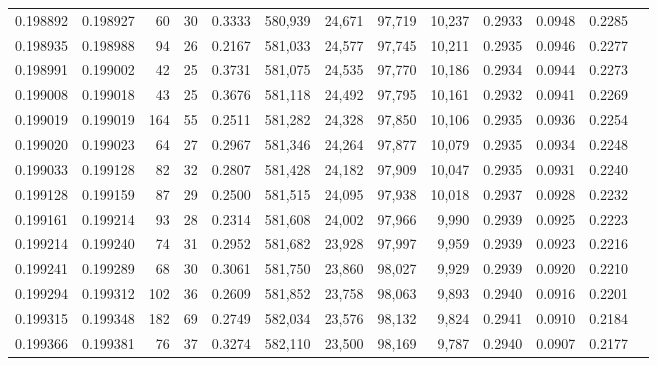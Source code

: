 \begin{tabular}{rrrrrrrrrrrrr}
0.198892 & 0.198927 &    60 &  30 &                                     0.3333 & 580,939 &  24,671 &  97,719 &  10,237 & 0.2933 & 0.0948 & 0.2285 \\
0.198935 & 0.198988 &    94 &  26 &                                     0.2167 & 581,033 &  24,577 &  97,745 &  10,211 & 0.2935 & 0.0946 & 0.2277 \\
0.198991 & 0.199002 &    42 &  25 &                                     0.3731 & 581,075 &  24,535 &  97,770 &  10,186 & 0.2934 & 0.0944 & 0.2273 \\
0.199008 & 0.199018 &    43 &  25 &                                     0.3676 & 581,118 &  24,492 &  97,795 &  10,161 & 0.2932 & 0.0941 & 0.2269 \\
0.199019 & 0.199019 &   164 &  55 &                                     0.2511 & 581,282 &  24,328 &  97,850 &  10,106 & 0.2935 & 0.0936 & 0.2254 \\
0.199020 & 0.199023 &    64 &  27 &                                     0.2967 & 581,346 &  24,264 &  97,877 &  10,079 & 0.2935 & 0.0934 & 0.2248 \\
0.199033 & 0.199128 &    82 &  32 &                                     0.2807 & 581,428 &  24,182 &  97,909 &  10,047 & 0.2935 & 0.0931 & 0.2240 \\
0.199128 & 0.199159 &    87 &  29 &                                     0.2500 & 581,515 &  24,095 &  97,938 &  10,018 & 0.2937 & 0.0928 & 0.2232 \\
0.199161 & 0.199214 &    93 &  28 &                                     0.2314 & 581,608 &  24,002 &  97,966 &   9,990 & 0.2939 & 0.0925 & 0.2223 \\
0.199214 & 0.199240 &    74 &  31 &                                     0.2952 & 581,682 &  23,928 &  97,997 &   9,959 & 0.2939 & 0.0923 & 0.2216 \\
0.199241 & 0.199289 &    68 &  30 &                                     0.3061 & 581,750 &  23,860 &  98,027 &   9,929 & 0.2939 & 0.0920 & 0.2210 \\
0.199294 & 0.199312 &   102 &  36 &                                     0.2609 & 581,852 &  23,758 &  98,063 &   9,893 & 0.2940 & 0.0916 & 0.2201 \\
0.199315 & 0.199348 &   182 &  69 &                                     0.2749 & 582,034 &  23,576 &  98,132 &   9,824 & 0.2941 & 0.0910 & 0.2184 \\
0.199366 & 0.199381 &    76 &  37 &                                     0.3274 & 582,110 &  23,500 &  98,169 &   9,787 & 0.2940 & 0.0907 & 0.2177 \\

\end{tabular}
